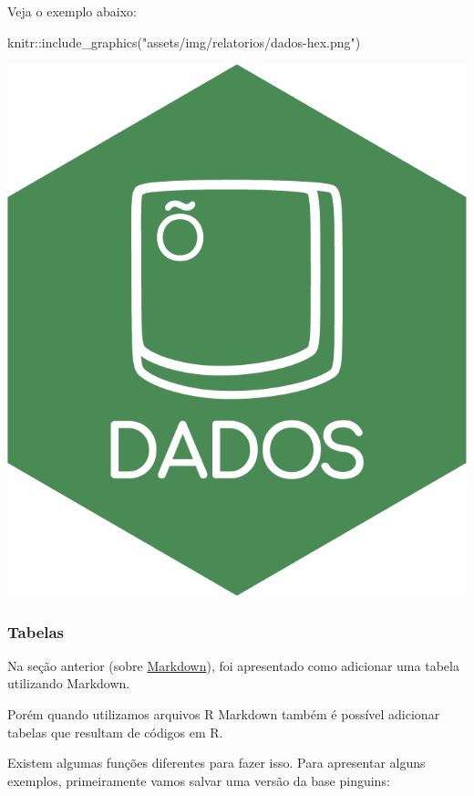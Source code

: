 \documentclass[
]{book}
\newenvironment{Shaded}{\begin{snugshade}}{\end{snugshade}}
\newcommand{\FunctionTok}[1]{\textcolor[rgb]{0.00,0.00,0.00}{#1}}
\newcommand{\NormalTok}[1]{#1}
\newcommand{\SpecialCharTok}[1]{\textcolor[rgb]{0.00,0.00,0.00}{#1}}
\newcommand{\StringTok}[1]{\textcolor[rgb]{0.31,0.60,0.02}{#1}}
\begin{document}
Veja o exemplo abaixo:

\begin{Shaded}
\begin{Highlighting}[]
\NormalTok{knitr}\SpecialCharTok{::}\FunctionTok{include\_graphics}\NormalTok{(}\StringTok{"assets/img/relatorios/dados{-}hex.png"}\NormalTok{)}
\end{Highlighting}
\end{Shaded}

\begin{center}\includegraphics[width=0.3\linewidth]{assets/img/relatorios/dados-hex} \end{center}

\hypertarget{tabelas-1}{%
\subsubsection{Tabelas}\label{tabelas-1}}

Na seção anterior (sobre \protect\hyperlink{markdown}{Markdown}), foi apresentado como adicionar uma tabela utilizando Markdown.

Porém quando utilizamos arquivos R Markdown também é possível adicionar tabelas que resultam de códigos em R.

Existem algumas funções diferentes para fazer isso. Para apresentar alguns exemplos, primeiramente vamos salvar uma versão da base pinguins:
\end{document}

